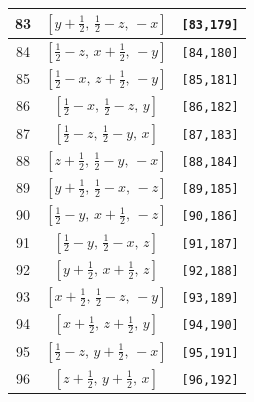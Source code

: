 \documentclass[fleqn,8pt]{jsarticle}
\begin{document}
\begin{longtable}{ccc}
83 & $\left[ y + \frac{1}{2},\, \frac{1}{2} - z,\, - x \right]$ & {\tt [83,179]} \\ \hline
84 & $\left[ \frac{1}{2} - z,\, x + \frac{1}{2},\, - y \right]$ & {\tt [84,180]} \\ \hline
85 & $\left[ \frac{1}{2} - x,\, z + \frac{1}{2},\, - y \right]$ & {\tt [85,181]} \\ \hline
86 & $\left[ \frac{1}{2} - x,\, \frac{1}{2} - z,\, y \right]$ & {\tt [86,182]} \\ \hline
87 & $\left[ \frac{1}{2} - z,\, \frac{1}{2} - y,\, x \right]$ & {\tt [87,183]} \\ \hline
88 & $\left[ z + \frac{1}{2},\, \frac{1}{2} - y,\, - x \right]$ & {\tt [88,184]} \\ \hline
89 & $\left[ y + \frac{1}{2},\, \frac{1}{2} - x,\, - z \right]$ & {\tt [89,185]} \\ \hline
90 & $\left[ \frac{1}{2} - y,\, x + \frac{1}{2},\, - z \right]$ & {\tt [90,186]} \\ \hline
91 & $\left[ \frac{1}{2} - y,\, \frac{1}{2} - x,\, z \right]$ & {\tt [91,187]} \\ \hline
92 & $\left[ y + \frac{1}{2},\, x + \frac{1}{2},\, z \right]$ & {\tt [92,188]} \\ \hline
93 & $\left[ x + \frac{1}{2},\, \frac{1}{2} - z,\, - y \right]$ & {\tt [93,189]} \\ \hline
94 & $\left[ x + \frac{1}{2},\, z + \frac{1}{2},\, y \right]$ & {\tt [94,190]} \\ \hline
95 & $\left[ \frac{1}{2} - z,\, y + \frac{1}{2},\, - x \right]$ & {\tt [95,191]} \\ \hline
96 & $\left[ z + \frac{1}{2},\, y + \frac{1}{2},\, x \right]$ & {\tt [96,192]} \\
\end{longtable}
\end{document}
